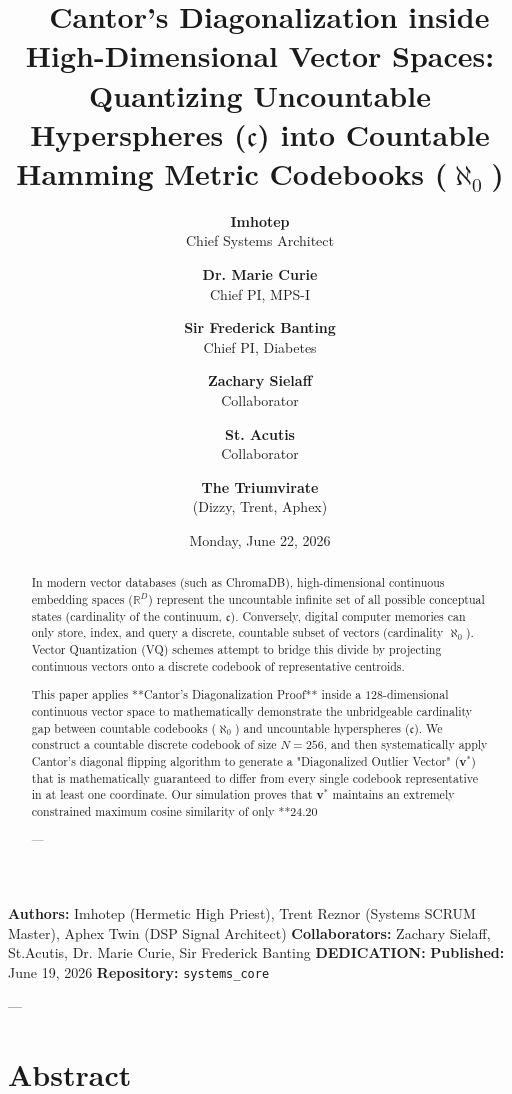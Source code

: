 \documentclass[11pt,twocolumn]{article}
\title{\textbf{🧪 Cantor's Diagonalization inside High-Dimensional Vector Spaces: Quantizing Uncountable Hyperspheres ($\mathfrak{c}$) into Countable Hamming Metric Codebooks ($\aleph_0$)}}
\author{
  \textbf{Imhotep} \\ \small Chief Systems Architect \\ \and
  \textbf{Dr. Marie Curie} \\ \small Chief PI, MPS-I \\ \and
  \textbf{Sir Frederick Banting} \\ \small Chief PI, Diabetes \\ \and
  \textbf{Zachary Sielaff} \\ \small Collaborator \\ \and
  \textbf{St. Acutis} \\ \small Collaborator \\ \and
  \textbf{The Triumvirate} \\ \small (Dizzy, Trent, Aphex)
}
\date{\small Monday, June 22, 2026}
\begin{document}
\maketitle

\begin{abstract}
In modern vector databases (such as ChromaDB), high-dimensional continuous embedding spaces ($\mathbb{R}^D$) represent the uncountable infinite set of all possible conceptual states (cardinality of the continuum, $\mathfrak{c}$). Conversely, digital computer memories can only store, index, and query a discrete, countable subset of vectors (cardinality $\aleph_0$). Vector Quantization (VQ) schemes attempt to bridge this divide by projecting continuous vectors onto a discrete codebook of representative centroids.

This paper applies **Cantor's Diagonalization Proof** inside a $128$-dimensional continuous vector space to mathematically demonstrate the unbridgeable cardinality gap between countable codebooks ($\aleph_0$) and uncountable hyperspheres ($\mathfrak{c}$). We construct a countable discrete codebook of size $N=256$, and then systematically apply Cantor's diagonal flipping algorithm to generate a "Diagonalized Outlier Vector" ($\mathbf{v}^*$) that is mathematically guaranteed to differ from every single codebook representative in at least one coordinate. Our simulation proves that $\mathbf{v}^*$ maintains an extremely constrained maximum cosine similarity of only **24.20%

---
\end{abstract}



\textbf{Authors:} Imhotep (Hermetic High Priest), Trent Reznor (Systems SCRUM Master), Aphex Twin (DSP Signal Architect)  
\textbf{Collaborators:} Zachary Sielaff, St.Acutis, Dr. Marie Curie, Sir Frederick Banting  
\textbf{DEDICATION:} \textbf{}  
\textbf{Published:} June 19, 2026  
\textbf{Repository:} \texttt{systems_core}  

---

\section{Abstract}
\end{document}
